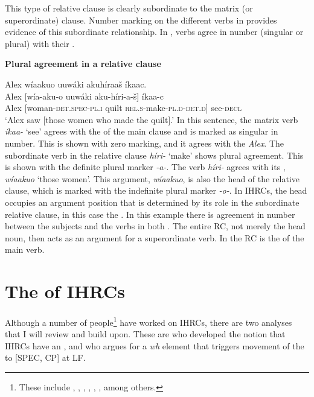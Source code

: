 \documentclass[output=paper]{LSP/langsci}
\begin{document}
This type of relative clause is clearly subordinate to the matrix (or superordinate) clause. Number marking on the different verbs in  provides evidence of this subordinate relationship. In , verbs agree in number (singular or plural) with their .

\ea \textbf{Plural agreement in a  relative clause} \label{boyle12}

\glll Alex {\ob}w\'iaakuo uuw\'aki akuh\'iraa\v{s}{\cb} \'ikaac.\\
Alex [w\'ia-aku-o    uuw\'aki  aku-h\'iri-a-\v{s}]  \'ikaa-c\\
Alex [woman-\textsc{det.spec-pl.i} quilt  \textsc{rel.s}-make-\textsc{pl.d}-\textsc{det.d}] see-\textsc{decl}\\
\trans `Alex saw [those women who made the quilt].' 
\z
In this sentence, the matrix verb \textit{\'ikaa-} `see' agrees with the  of the main clause and is marked as singular in number. This is shown with zero marking, and it agrees with the  \textit{Alex}. The subordinate verb in the relative clause \textit{h\'iri-} `make' shows plural agreement. This is shown with the definite plural marker \textit{-a-}.  The verb \textit{h\'iri-} agrees with its , \textit{w\'iaakuo} `those women'. This argument, \textit{w\'iaakuo}, is also the head of the relative clause, which is marked with the indefinite plural marker \textit{-o-}. In IHRCs, the head occupies an argument position that is determined by its role in the subordinate relative clause, in this case the . In this example there is agreement in number between the subjects and the verbs in both . The entire RC, not merely the head noun, then acts as an argument for a superordinate verb. In  the RC is the  of the main verb.

\section{The  of IHRCs}\label{sec:boyle:4}

Although a number of people\footnote{These include \citet{HalePlatero1974}, \citet{Gorbet1976}, \citet{Fauconnier1979}, \citet{Cole1987}, \citet{Culy1990}, \citet{Kayne1994} \citet{Bianchi1999}, \citet{Citko2001} among others.} have worked on IHRCs, there are two analyses that I will review and build upon. These are \citet{Williamson1987} who developed the notion that IHRCs have an , and \citet{Culy1990} who argues for a \textit{wh} element that triggers movement of the  to [SPEC, CP] at LF.
\end{document}
